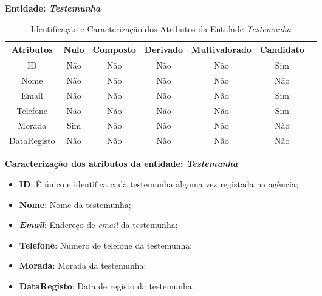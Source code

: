 \documentclass[a4paper,12pt]{scrreprt}
\newcommand{\Nao}{%
    \cellcolor{red!40}Não
}
\newcommand{\Sim}{%
    \cellcolor{green!40}Sim
}
\begin{document}
        \clearpage
        
        \textbf{Entidade: \textit{Testemunha}}
        \begin{table}[!ht]
        \centering
        \begin{tabular}{|c|c|c|c|c|c|c|}
        \hline
        \rowcolor{gray!20!white}
        \textbf{Atributos} & \textbf{Nulo} & \textbf{Composto} & \textbf{Derivado} & \textbf{Multivalorado} & \textbf{Candidato} \\
        \hline
        ID                  & \Nao & \Nao & \Nao & \Nao & \Sim \\
        Nome                & \Nao & \Nao & \Nao & \Nao & \Nao \\  
        Email               & \Nao & \Nao & \Nao & \Nao & \Sim \\
        Telefone            & \Nao & \Nao & \Nao & \Nao & \Sim \\
        Morada              & \Sim & \Nao & \Nao & \Nao & \Nao \\
        DataRegisto         & \Nao & \Nao & \Nao & \Nao & \Nao \\
        \hline
        \end{tabular}
        \caption{Identificação e Caracterização dos Atributos da Entidade \textit{Testemunha}}
        \end{table}

        \textbf{Caracterização dos atributos da entidade: \textit{Testemunha}}
        \begin{itemize}
            \item \textbf{ID}: É único e identifica cada testemunha alguma vez registada na agência;
            \item \textbf{Nome}: Nome da testemunha;
            \item \textbf{\textit{Email}}: Endereço de \textit{email} da testemunha; 
            \item \textbf{Telefone}: Número de telefone da testemunha;
            \item \textbf{Morada}: Morada da testemunha;
            \item \textbf{DataRegisto}: Data de registo da testemunha.
        \end{itemize}

        \vspace{1cm}
        
\end{document}
